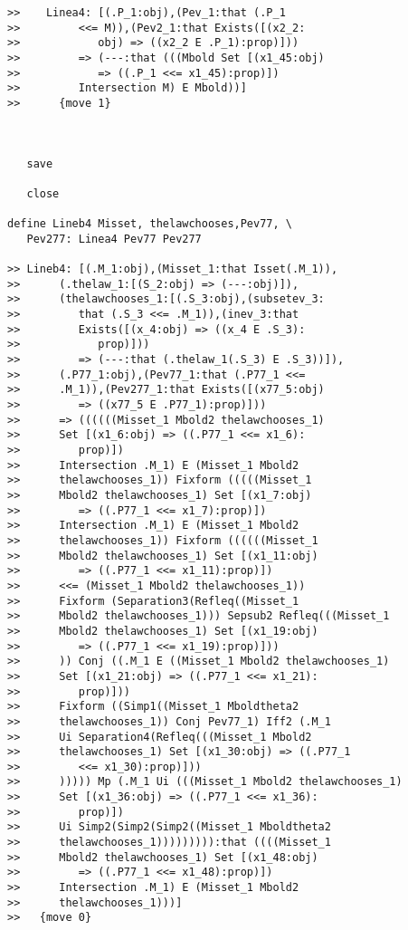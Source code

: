 \documentclass[12pt]{article}
\begin{document}
\begin{verbatim}
>>    Linea4: [(.P_1:obj),(Pev_1:that (.P_1
>>         <<= M)),(Pev2_1:that Exists([(x2_2:
>>            obj) => ((x2_2 E .P_1):prop)]))
>>         => (---:that (((Mbold Set [(x1_45:obj)
>>            => ((.P_1 <<= x1_45):prop)])
>>         Intersection M) E Mbold))]
>>      {move 1}



   save

   close

define Lineb4 Misset, thelawchooses,Pev77, \
   Pev277: Linea4 Pev77 Pev277

>> Lineb4: [(.M_1:obj),(Misset_1:that Isset(.M_1)),
>>      (.thelaw_1:[(S_2:obj) => (---:obj)]),
>>      (thelawchooses_1:[(.S_3:obj),(subsetev_3:
>>         that (.S_3 <<= .M_1)),(inev_3:that
>>         Exists([(x_4:obj) => ((x_4 E .S_3):
>>            prop)]))
>>         => (---:that (.thelaw_1(.S_3) E .S_3))]),
>>      (.P77_1:obj),(Pev77_1:that (.P77_1 <<=
>>      .M_1)),(Pev277_1:that Exists([(x77_5:obj)
>>         => ((x77_5 E .P77_1):prop)]))
>>      => ((((((Misset_1 Mbold2 thelawchooses_1)
>>      Set [(x1_6:obj) => ((.P77_1 <<= x1_6):
>>         prop)])
>>      Intersection .M_1) E (Misset_1 Mbold2
>>      thelawchooses_1)) Fixform (((((Misset_1
>>      Mbold2 thelawchooses_1) Set [(x1_7:obj)
>>         => ((.P77_1 <<= x1_7):prop)])
>>      Intersection .M_1) E (Misset_1 Mbold2
>>      thelawchooses_1)) Fixform ((((((Misset_1
>>      Mbold2 thelawchooses_1) Set [(x1_11:obj)
>>         => ((.P77_1 <<= x1_11):prop)])
>>      <<= (Misset_1 Mbold2 thelawchooses_1))
>>      Fixform (Separation3(Refleq((Misset_1
>>      Mbold2 thelawchooses_1))) Sepsub2 Refleq(((Misset_1
>>      Mbold2 thelawchooses_1) Set [(x1_19:obj)
>>         => ((.P77_1 <<= x1_19):prop)]))
>>      )) Conj ((.M_1 E ((Misset_1 Mbold2 thelawchooses_1)
>>      Set [(x1_21:obj) => ((.P77_1 <<= x1_21):
>>         prop)]))
>>      Fixform ((Simp1((Misset_1 Mboldtheta2
>>      thelawchooses_1)) Conj Pev77_1) Iff2 (.M_1
>>      Ui Separation4(Refleq(((Misset_1 Mbold2
>>      thelawchooses_1) Set [(x1_30:obj) => ((.P77_1
>>         <<= x1_30):prop)]))
>>      ))))) Mp (.M_1 Ui (((Misset_1 Mbold2 thelawchooses_1)
>>      Set [(x1_36:obj) => ((.P77_1 <<= x1_36):
>>         prop)])
>>      Ui Simp2(Simp2(Simp2((Misset_1 Mboldtheta2
>>      thelawchooses_1))))))))):that ((((Misset_1
>>      Mbold2 thelawchooses_1) Set [(x1_48:obj)
>>         => ((.P77_1 <<= x1_48):prop)])
>>      Intersection .M_1) E (Misset_1 Mbold2
>>      thelawchooses_1)))]
>>   {move 0}




\end{verbatim}
\end{document}
